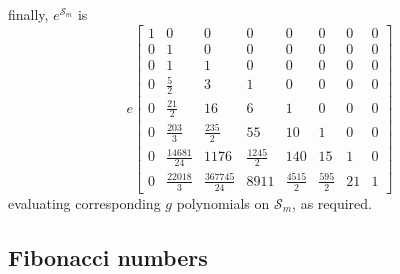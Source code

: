 finally, $e^{\mathcal{S}_{m}}$ is
\begin{displaymath}
e \left[\begin{matrix}1 & 0 & 0 & 0 & 0 & 0 & 0 & 0\\0 & 1 & 0 & 0 & 0 & 0 & 0 & 0\\0 & 1 & 1 & 0 & 0 & 0 & 0 & 0\\0 & \frac{5}{2} & 3 & 1 & 0 & 0 & 0 & 0\\0 & \frac{21}{2} & 16 & 6 & 1 & 0 & 0 & 0\\0 & \frac{203}{3} & \frac{235}{2} & 55 & 10 & 1 & 0 & 0\\0 & \frac{14681}{24} & 1176 & \frac{1245}{2} & 140 & 15 & 1 & 0\\0 & \frac{22018}{3} & \frac{367745}{24} & 8911 & \frac{4515}{2} & \frac{595}{2} & 21 & 1\end{matrix}\right]
\end{displaymath}
evaluating corresponding $g$ polynomials on $\mathcal{S}_{m}$, as required.

\subsection{Fibonacci numbers}

